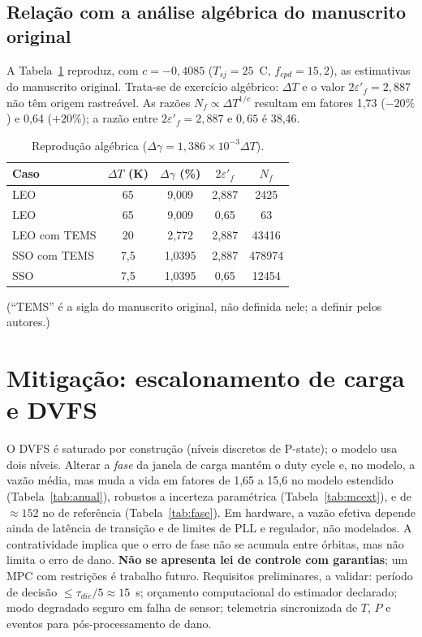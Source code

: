 \documentclass[12pt,a4paper]{article}
\begin{document}
\subsection{Relação com a análise algébrica do manuscrito original}
A Tabela~\ref{tab:orig} reproduz, com $c=-0{,}4085$ ($T_{sj}=25$~\textdegree C,
$f_{cpd}=15{,}2$), as estimativas do manuscrito original. Trata-se de exercício
algébrico: $\Delta T$ e o valor $2\varepsilon'_f=2{,}887$ não têm origem
rastreável. As razões $N_f\propto\Delta T^{1/c}$ resultam em fatores 1,73
($-20\%$) e 0,64 ($+20\%$); a razão entre $2\varepsilon'_f=2{,}887$ e $0{,}65$ é
38,46.
\begin{table}[h]\centering\small
\caption{Reprodução algébrica ($\Delta\gamma=1{,}386\times10^{-3}\Delta T$).}
\label{tab:orig}
\begin{tabular}{@{}lcccc@{}}\toprule
Caso & $\Delta T$ (K) & $\Delta\gamma$ (\%) & $2\varepsilon'_f$ & $N_f$\\\midrule
LEO & 65 & 9,009 & 2,887 & 2425\\
LEO & 65 & 9,009 & 0,65 & 63\\
LEO com TEMS & 20 & 2,772 & 2,887 & 43416\\
SSO com TEMS & 7,5 & 1,0395 & 2,887 & 478974\\
SSO & 7,5 & 1,0395 & 0,65 & 12454\\
\bottomrule\end{tabular}\end{table}
(``TEMS'' é a sigla do manuscrito original, não definida nele; a definir pelos
autores.)

\section{Mitigação: escalonamento de carga e DVFS}
O DVFS é saturado por construção (níveis discretos de P-state); o modelo usa
dois níveis. Alterar a \emph{fase} da janela de carga mantém o duty cycle e, no
modelo, a vazão média, mas muda a vida em fatores de 1,65 a 15,6 no modelo
estendido (Tabela~\ref{tab:anual}), robustos a incerteza paramétrica
(Tabela~\ref{tab:mcext}), e de $\approx152$ no de referência
(Tabela~\ref{tab:fase}). Em hardware, a vazão efetiva depende ainda de latência
de transição e de limites de PLL e regulador, não modelados. A contratividade
implica que o erro de fase não se acumula entre órbitas, mas não limita o erro
de dano. \textbf{Não se apresenta lei de controle com garantias}; um MPC com
restrições \cite{mayne2000} é trabalho futuro. Requisitos preliminares, a
validar: período de decisão $\le\tau_{die}/5\approx15$~s; orçamento
computacional do estimador declarado; modo degradado seguro em falha de sensor;
telemetria sincronizada de $T$, $P$ e eventos para pós-processamento de dano.
\end{document}
